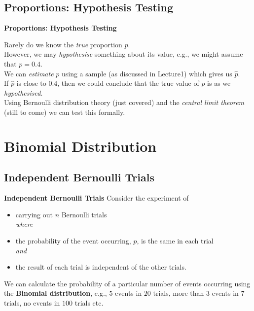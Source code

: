 \documentclass[compress]{beamer}        %
\makeatletter
\newcommand{\tcb}{\textcolor{beamer@blendedblue}}
\makeatother
\begin{document}
\subsection{Proportions: Hypothesis Testing}
\begin{frame}{\bf \tcb{Proportions: Hypothesis Testing}}

Rarely do we know the \emph{true} proportion $p$.\\[0.5cm]

However, we may \emph{hypothesise} something about its value, e.g., we might assume that $p = 0.4$.\\[0.5cm]

We can \emph{estimate} $p$ using a sample (as discussed in Lecture1) which gives us $\hat p$.\\[0.5cm]

If $\hat p$ is close to 0.4, then we could conclude that the true value of $p$ is as we \emph{hypothesised}.\\[0.5cm]

Using Bernoulli distribution theory (just covered) and the \emph{central limit theorem} (still to come) we can test this formally.

\end{frame}


\section{Binomial Distribution}
\subsection{Independent Bernoulli Trials}
\begin{frame}{\bf \tcb{Independent Bernoulli Trials}}
Consider the experiment of\\[0.2cm]
\begin{itemize}\itemsep0.4cm
\item carrying out $n$ Bernoulli trials\\[0.4cm]
\emph{where}
\item the probability of the event occurring, $p$, is the same in each trial \\[0.4cm]
\emph{and}
\item the result of each trial is independent of the other trials.\\[0.5cm]
\end{itemize}

We can calculate the probability of a particular number of events occurring using the {\bf Binomial distribution}, e.g., $5$ events in $20$ trials, more than $3$ events in 7 trials, no events in $100$ trials etc.

\end{frame}
\end{document}
